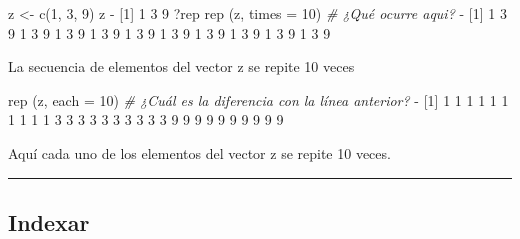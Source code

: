 \documentclass[
]{book}
\newenvironment{Shaded}{\begin{snugshade}}{\end{snugshade}}
\newcommand{\AttributeTok}[1]{\textcolor[rgb]{0.77,0.63,0.00}{#1}}
\newcommand{\CommentTok}[1]{\textcolor[rgb]{0.56,0.35,0.01}{\textit{#1}}}
\newcommand{\DecValTok}[1]{\textcolor[rgb]{0.00,0.00,0.81}{#1}}
\newcommand{\FunctionTok}[1]{\textcolor[rgb]{0.00,0.00,0.00}{#1}}
\newcommand{\NormalTok}[1]{#1}
\newcommand{\OtherTok}[1]{\textcolor[rgb]{0.56,0.35,0.01}{#1}}
\newcommand{\SpecialCharTok}[1]{\textcolor[rgb]{0.00,0.00,0.00}{#1}}
\begin{document}
\begin{Shaded}
\begin{Highlighting}[]
\NormalTok{z }\OtherTok{\textless{}{-}} \FunctionTok{c}\NormalTok{(}\DecValTok{1}\NormalTok{, }\DecValTok{3}\NormalTok{, }\DecValTok{9}\NormalTok{)}
\NormalTok{z}
\SpecialCharTok{{-}}\NormalTok{ [}\DecValTok{1}\NormalTok{] }\DecValTok{1} \DecValTok{3} \DecValTok{9}
\NormalTok{?rep}
\FunctionTok{rep}\NormalTok{ (z, }\AttributeTok{times =} \DecValTok{10}\NormalTok{) }\CommentTok{\# ¿Qué ocurre aqui?}
\SpecialCharTok{{-}}\NormalTok{  [}\DecValTok{1}\NormalTok{] }\DecValTok{1} \DecValTok{3} \DecValTok{9} \DecValTok{1} \DecValTok{3} \DecValTok{9} \DecValTok{1} \DecValTok{3} \DecValTok{9} \DecValTok{1} \DecValTok{3} \DecValTok{9} \DecValTok{1} \DecValTok{3} \DecValTok{9} \DecValTok{1} \DecValTok{3} \DecValTok{9} \DecValTok{1} \DecValTok{3} \DecValTok{9} \DecValTok{1} \DecValTok{3} \DecValTok{9} \DecValTok{1} \DecValTok{3} \DecValTok{9} \DecValTok{1} \DecValTok{3} \DecValTok{9}
\end{Highlighting}
\end{Shaded}

La secuencia de elementos del vector z se repite 10 veces

\begin{Shaded}
\begin{Highlighting}[]
\FunctionTok{rep}\NormalTok{ (z, }\AttributeTok{each =} \DecValTok{10}\NormalTok{) }\CommentTok{\# ¿Cuál es la diferencia con la línea anterior?}
\SpecialCharTok{{-}}\NormalTok{  [}\DecValTok{1}\NormalTok{] }\DecValTok{1} \DecValTok{1} \DecValTok{1} \DecValTok{1} \DecValTok{1} \DecValTok{1} \DecValTok{1} \DecValTok{1} \DecValTok{1} \DecValTok{1} \DecValTok{3} \DecValTok{3} \DecValTok{3} \DecValTok{3} \DecValTok{3} \DecValTok{3} \DecValTok{3} \DecValTok{3} \DecValTok{3} \DecValTok{3} \DecValTok{9} \DecValTok{9} \DecValTok{9} \DecValTok{9} \DecValTok{9} \DecValTok{9} \DecValTok{9} \DecValTok{9} \DecValTok{9} \DecValTok{9}
\end{Highlighting}
\end{Shaded}

Aquí cada uno de los elementos del vector z se repite 10 veces.

\begin{center}\rule{0.5\linewidth}{0.5pt}\end{center}

\hypertarget{indexar}{%
\subsection{Indexar}\label{indexar}}
\end{document}
